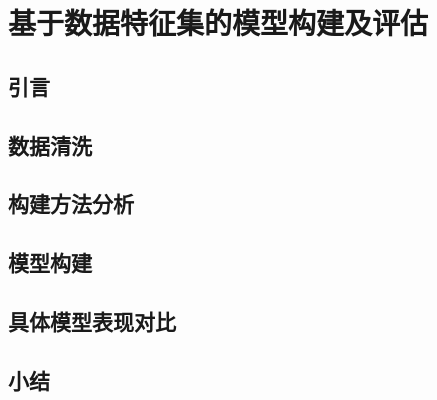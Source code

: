 \chapter{基于数据特征集的模型构建及评估}
\section{引言}

\section{数据清洗}
\section{构建方法分析}
\section{模型构建}
\section{具体模型表现对比}
\section{小结}